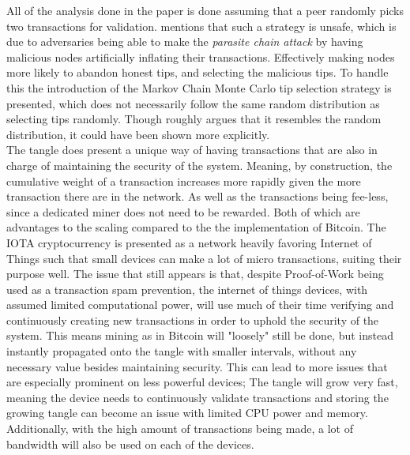 All of the analysis done in the paper is done assuming that a peer randomly picks two transactions for validation. 
\cite{tangle} mentions that such a strategy is unsafe, which is due to adversaries being able to make the \emph{parasite chain attack} by having malicious nodes artificially inflating their transactions. Effectively making nodes more likely to abandon honest tips, and selecting the malicious tips. To handle this the introduction of the Markov Chain Monte Carlo tip selection strategy is presented, which does not necessarily follow the same random distribution as selecting tips randomly. Though \cite{tangle} roughly argues that it resembles the random distribution, it could have been shown more explicitly. \\

The tangle does present a unique way of having transactions that are also in charge of maintaining the security of the system. Meaning, by construction, the cumulative weight of a transaction increases more rapidly given the more transaction there are in the network. As well as the transactions being fee-less, since a dedicated miner does not need to be rewarded. Both of which are advantages to the scaling compared to the the implementation of Bitcoin. The IOTA cryptocurrency is presented as a network heavily favoring Internet of Things such that small devices can make a lot of micro transactions, suiting their purpose well. The issue that still appears is that, despite Proof-of-Work being used as a transaction spam prevention, the internet of things devices, with assumed limited computational power, will use much of their time verifying and continuously creating new transactions in order to uphold the security of the system. This means mining as in Bitcoin will "loosely" still be done, but instead instantly propagated onto the tangle with smaller intervals, without any necessary value besides maintaining security. This can lead to more issues that are especially prominent on less powerful devices; The tangle will grow very fast, meaning the device needs to continuously validate transactions and storing the growing tangle can become an issue with limited CPU power and memory. Additionally, with the high amount of transactions being made, a lot of bandwidth will also be used on each of the devices.\\

